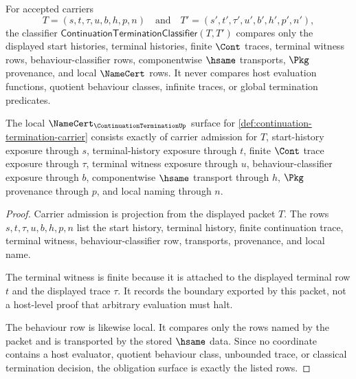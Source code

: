 \begin{definition}
\label{def:continuation-termination-classifier}
For accepted carriers
$$
T=(s,t,\tau,u,b,h,p,n)
\quad\text{and}\quad
T'=(s',t',\tau',u',b',h',p',n'),
$$
the classifier $\mathsf{ContinuationTerminationClassifier}(T,T')$ compares only the displayed start histories, terminal histories, finite $\Cont$ traces, terminal witness rows, behaviour-classifier rows, componentwise $\hsame$ transports, $\Pkg$ provenance, and local $\NameCert$ rows. It never compares host evaluation functions, quotient behaviour classes, infinite traces, or global termination predicates.
\end{definition}

\begin{theorem}
\label{thm:continuation-termination-namecert-obligations}
The local $\NameCert_{\ContinuationTerminationUp}$ surface for \autoref{def:continuation-termination-carrier} consists exactly of carrier admission for $T$, start-history exposure through $s$, terminal-history exposure through $t$, finite $\Cont$ trace exposure through $\tau$, terminal witness exposure through $u$, behaviour-classifier exposure through $b$, componentwise $\hsame$ transport through $h$, $\Pkg$ provenance through $p$, and local naming through $n$.
\end{theorem}
\begin{proof}
Carrier admission is projection from the displayed packet $T$. The rows $s,t,\tau,u,b,h,p,n$ list the start history, terminal history, finite continuation trace, terminal witness, behaviour-classifier row, transports, provenance, and local name.

The terminal witness is finite because it is attached to the displayed terminal row $t$ and the displayed trace $\tau$. It records the boundary exported by this packet, not a host-level proof that arbitrary evaluation must halt.

The behaviour row is likewise local. It compares only the rows named by the packet and is transported by the stored $\hsame$ data. Since no coordinate contains a host evaluator, quotient behaviour class, unbounded trace, or classical termination decision, the obligation surface is exactly the listed rows.
\end{proof}

